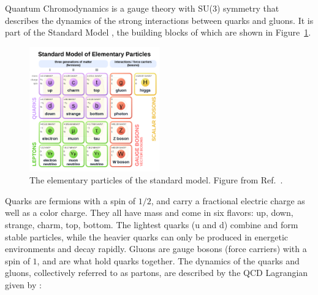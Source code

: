 Quantum Chromodynamics is a gauge theory with SU(3) symmetry that describes the dynamics of the strong interactions between quarks and gluons.
It is part of the Standard Model \cite{Gaillard:1998ui}, the building blocks of which are shown in Figure~\ref{fig:sm_particles}.


\begin{figure}[htbp]
\begin{center}
\includegraphics[width=0.5\textwidth]{figures/theory/SM}
\caption{The elementary particles of the standard model.
Figure from Ref.~\cite{SMpict}.}
\label{fig:sm_particles}
\end{center}
\end{figure}


Quarks are fermions with a spin of $1/2$, and carry a fractional electric charge as well as a color charge.
They all have mass and come in six flavors: up, down, strange, charm, top, bottom.
The lightest quarks (u and d) combine and form stable particles, while the heavier quarks can only be produced in energetic environments and decay rapidly.
Gluons are gauge bosons (force carriers) with a spin of $1$, and are what hold quarks together.
The dynamics of the quarks and gluons, collectively referred to as partons, are described by the QCD Lagrangian given by \cite{Beringer:1481544}:

